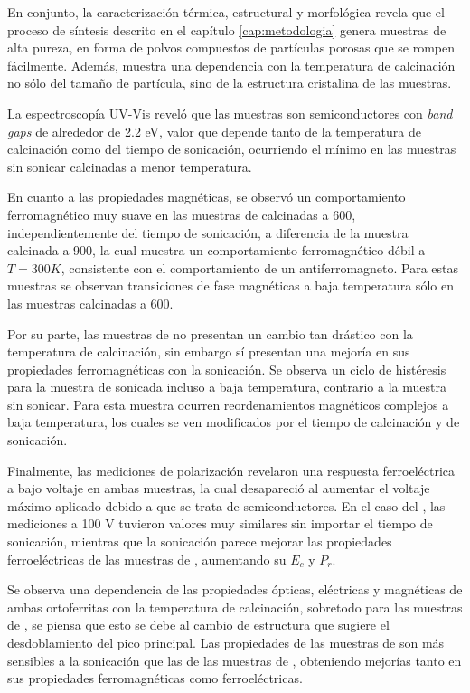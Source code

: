 \documentclass[../main.tex]{subfiles}
\begin{document}
En conjunto, la caracterización térmica, estructural y morfológica revela que el proceso de síntesis descrito en el capítulo \ref{cap:metodologia} genera muestras de alta pureza, en forma de polvos compuestos de partículas porosas que se rompen fácilmente. Además, muestra una dependencia con la temperatura de calcinación no sólo del tamaño de partícula, sino de la estructura cristalina de las muestras.

La espectroscopía UV-Vis reveló que las muestras son semiconductores con \textit{band gaps} de alrededor de 2.2 eV, valor que depende tanto de la temperatura de calcinación como del tiempo de sonicación, ocurriendo el mínimo en las muestras sin sonicar calcinadas a menor temperatura.

En cuanto a las propiedades magnéticas, se observó un comportamiento ferromagnético muy suave en las muestras de \neod{} calcinadas a 600\gradoC{}, independientemente del tiempo de sonicación, a diferencia de la muestra calcinada a 900\gradoC{}, la cual muestra un comportamiento ferromagnético débil a $T=300 K$, consistente con el comportamiento de un antiferromagneto. Para estas muestras se observan transiciones de fase magnéticas a baja temperatura sólo en las muestras calcinadas a 600\gradoC{}.

Por su parte, las muestras de \sama{} no presentan un cambio tan drástico con la temperatura de calcinación, sin embargo sí presentan una mejoría en sus propiedades ferromagnéticas con la sonicación. Se observa un ciclo de histéresis para la muestra de \sama{} sonicada incluso a baja temperatura, contrario a la muestra sin sonicar. Para esta muestra ocurren reordenamientos magnéticos complejos a baja temperatura, los cuales se ven modificados por el tiempo de calcinación y de sonicación.

Finalmente, las mediciones de polarización revelaron una respuesta ferroeléctrica a bajo voltaje en ambas muestras, la cual desapareció al aumentar el voltaje máximo aplicado debido a que se trata de semiconductores. En el caso del \neod{}, las mediciones a 100 V tuvieron valores muy similares sin importar el tiempo de sonicación, mientras que la sonicación parece mejorar las propiedades ferroeléctricas de las muestras de \sama{}, aumentando su $E_c$ y $P_r$.

Se observa una dependencia de las propiedades ópticas, eléctricas y magnéticas de ambas ortoferritas con la temperatura de calcinación, sobretodo para las muestras de \neod{}, se piensa que esto se debe al cambio de estructura que sugiere el desdoblamiento del pico principal. Las propiedades de las muestras de \sama{} son más sensibles a la sonicación que las de las muestras de \neod{}, obteniendo mejorías tanto en sus propiedades ferromagnéticas como ferroeléctricas.
\end{document}
